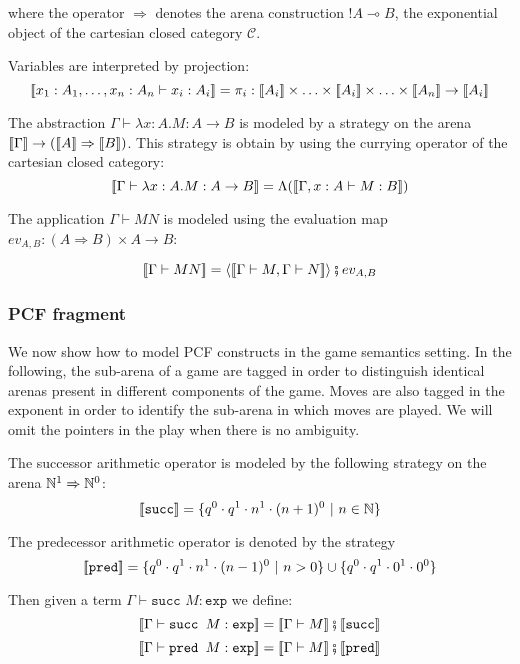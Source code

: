 where the operator $\Rightarrow$ denotes the arena construction $!A
\multimap B$, the exponential object of the cartesian closed
category $\mathcal{C}$.



Variables are interpreted by projection:
$$\sem{x_1 : A_1, \ldots, x_n:A_n \vdash x_i : A_i} = \pi_i : \sem{A_i} \times \ldots \times \sem{A_i} \times \ldots \times \sem{A_n} \rightarrow  \sem{A_i}$$

The abstraction $\Gamma \vdash \lambda x :A.M : A \rightarrow B$ is
modeled by a strategy on the arena ${[\![ \Gamma ]\!]} \rightarrow
({[\![ A ]\!]}\Rightarrow{[\![B ]\!]})$. This strategy is obtain by using the
currying operator of the cartesian closed category:
$${[\![ \Gamma \vdash \lambda x :A.M : A \rightarrow B ]\!]} = \Lambda( {[\![ \Gamma, x :A \vdash M : B ]\!]})$$

The application $\Gamma \vdash M N$ is modeled using the evaluation
map $ev_{A,B} : (A\Rightarrow B)\times A \rightarrow B$:

$${[\![ \Gamma \vdash M N ]\!]} = \langle {[\![\Gamma \vdash M, \Gamma \vdash N ]\!]} \rangle \fatsemi ev_{A,B}$$


\subsubsection{PCF fragment}

We now show how to model PCF constructs in the game semantics
setting. In the following, the sub-arena of a game are tagged in
order to distinguish identical arenas present in different
components of the game. Moves are also tagged in the exponent in
order to identify the sub-arena in which moves are played. We will
omit the pointers in the play when there is no ambiguity.

The successor arithmetic operator is modeled by the following
strategy on the arena $\mathbb{N}^1 \Rightarrow \mathbb{N}^0$:
$${[\![ \texttt{succ} ]\!]} = \{q^0 \cdot q^1 \cdot n^1 \cdot (n+1)^0\ |\ n \in \mathbb{N} \}$$

The predecessor arithmetic operator is denoted by the strategy
$${[\![ \texttt{pred} ]\!]} = \{q^0 \cdot q^1 \cdot n^1 \cdot (n-1)^0\ |\ n >0 \} \cup \{ q^0 \cdot q^1 \cdot 0^1 \cdot 0^0 \} $$

Then given a term $\Gamma \vdash \texttt{succ }M : \texttt{exp}$ we
define:
$${[\![ \Gamma \vdash \texttt{succ } M : \texttt{exp} ]\!]} = {[\![ \Gamma \vdash M ]\!]} \fatsemi {[\![\texttt{succ} ]\!]} $$
$${[\![ \Gamma \vdash \texttt{pred } M : \texttt{exp} ]\!]} = {[\![ \Gamma \vdash M ]\!]} \fatsemi {[\![\texttt{pred} ]\!]} $$


